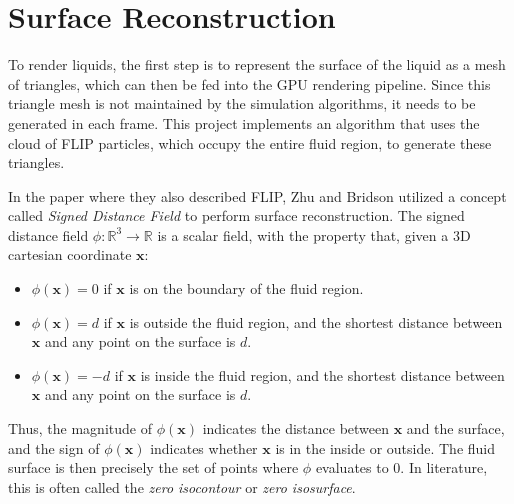 \section{Surface Reconstruction}
\label{section surface reconstruction}
To render liquids, the first step is to represent the surface of the liquid as a mesh of triangles, which can then be fed into the GPU rendering pipeline. Since this triangle mesh is not maintained by the simulation algorithms, it needs to be generated in each frame. This project implements an algorithm that uses the cloud of FLIP particles, which occupy the entire fluid region, to generate these triangles.

In the paper where they also described FLIP\cite{zhu2005animating}, Zhu and Bridson utilized a concept called \textit{Signed Distance Field} to perform surface reconstruction. The signed distance field $\phi : \mathbb{R} ^3 \rightarrow \mathbb{R}$  is a scalar field, with the property that, given a 3D cartesian coordinate $\textbf{x}$:
\begin{itemize}
    \item $\phi(\textbf{x}) = 0$ if $\textbf{x}$ is on the boundary of the fluid region.
    
    \item $\phi(\textbf{x}) = d$ if $\textbf{x}$ is outside the fluid region, and the shortest distance between $\textbf{x}$ and any point on the surface is $d$.
    
    \item $\phi(\textbf{x}) = -d$ if $\textbf{x}$ is inside the fluid region, and the shortest distance between $\textbf{x}$ and any point on the surface is $d$.
\end{itemize}
Thus, the magnitude of $\phi(\textbf{x})$ indicates the distance between $\textbf{x}$ and the surface, and the sign of $\phi(\textbf{x})$ indicates whether $\textbf{x}$ is in the inside or outside. The fluid surface is then precisely the set of points where $\phi$ evaluates to 0. In literature, this is often called the \textit{zero isocontour} or \textit{zero isosurface}.

